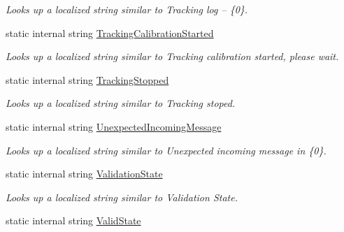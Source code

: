 \begin{DoxyCompactItemize}
\begin{DoxyCompactList}\small\item\em Looks up a localized string similar to Tracking log – \{0\}. \end{DoxyCompactList}\item 
static internal string \mbox{\hyperlink{class_chess_tracking_1_1_localization_1_1_program_localization_aa95cd659dfdeda70ef25294243a33ead}{Tracking\+Calibration\+Started}}
\begin{DoxyCompactList}\small\item\em Looks up a localized string similar to Tracking calibration started, please wait. \end{DoxyCompactList}\item 
static internal string \mbox{\hyperlink{class_chess_tracking_1_1_localization_1_1_program_localization_a15949121cc9dfa65b0ec024a28af2fc2}{Tracking\+Stopped}}
\begin{DoxyCompactList}\small\item\em Looks up a localized string similar to Tracking stoped. \end{DoxyCompactList}\item 
static internal string \mbox{\hyperlink{class_chess_tracking_1_1_localization_1_1_program_localization_ac0a4d67a5458baa0f25e2cea42ac675a}{Unexpected\+Incoming\+Message}}
\begin{DoxyCompactList}\small\item\em Looks up a localized string similar to Unexpected incoming message in \{0\}. \end{DoxyCompactList}\item 
static internal string \mbox{\hyperlink{class_chess_tracking_1_1_localization_1_1_program_localization_a24c9f4a194e148aeff22f0328df34373}{Validation\+State}}
\begin{DoxyCompactList}\small\item\em Looks up a localized string similar to Validation State. \end{DoxyCompactList}\item 
static internal string \mbox{\hyperlink{class_chess_tracking_1_1_localization_1_1_program_localization_a542743c45d1506c745a33c38204c004d}{Valid\+State}}

\end{DoxyCompactItemize}
